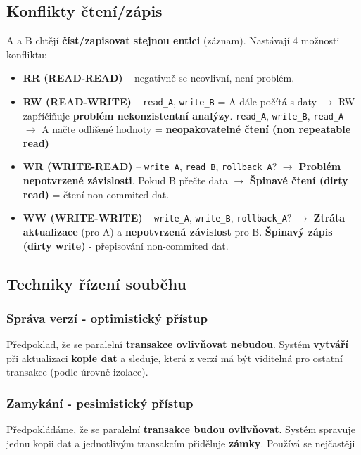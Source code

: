 \subsection{Konflikty čtení/zápis}
A a B chtějí \textbf{číst/zapisovat stejnou entici} (záznam). Nastávají 4 možnosti konfliktu:
\begin{itemize}
\item \textbf{RR (READ-READ)} -- negativně se neovlivní, není problém.
\item \textbf{RW (READ-WRITE)} -- \texttt{read\_A}, \texttt{write\_B} = A dále počítá s daty $\rightarrow$ RW zapříčiňuje \textbf{problém nekonzistentní analýzy}. \texttt{read\_A}, \texttt{write\_B}, \texttt{read\_A} $\rightarrow$ A načte odlišené hodnoty = \textbf{neopakovatelné čtení (non repeatable read)}
\item \textbf{WR (WRITE-READ)} -- \texttt{write\_A}, \texttt{read\_B}, \texttt{rollback\_A}? $\rightarrow$ \textbf{Problém nepotvrzené závislosti}. Pokud B přečte data $\rightarrow$ \textbf{Špinavé čtení (dirty read)} = čtení non-commited dat.
\item \textbf{WW (WRITE-WRITE)} -- \texttt{write\_A}, \texttt{write\_B}, \texttt{rollback\_A}? $\rightarrow$ \textbf{Ztráta aktualizace} (pro A) a \textbf{nepotvrzená závislost} pro B. \textbf{Špinavý zápis}\textbf{ (dirty write)} - přepisování non-commited dat.
\end{itemize}

\subsection{Techniky řízení souběhu}
\subsubsection{Správa verzí - optimistický přístup}
Předpoklad, že se paralelní \textbf{transakce ovlivňovat nebudou}. Systém \textbf{vytváří} při aktualizaci\textbf{ kopie dat }a sleduje, která z verzí má být viditelná pro ostatní transakce (podle úrovně izolace).

\subsubsection{Zamykání - pesimistický přístup}
Předpokládáme, že se paralelní \textbf{transakce budou ovlivňovat}. Systém spravuje jednu kopii dat a jednotlivým transakcím přiděluje \textbf{zámky}. Používá se nejčastěji


